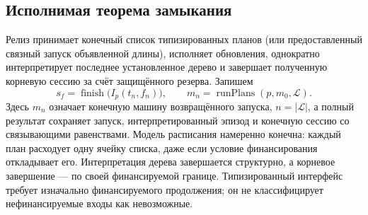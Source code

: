 \documentclass[10pt,a4paper]{article}
\newcommand{\finish}{\operatorname{finish}}
\begin{document}
\subsection{Исполнимая теорема замыкания}
Релиз принимает конечный список типизированных планов (или предоставленный связный запуск объявленной длины), исполняет обновления, однократно интерпретирует последнее установленное дерево и завершает полученную корневую сессию за счёт защищённого резерва. Запишем
\begin{equation}\label{eq:release-pipeline}
 s_f=\finish\bigl(I_p(t_n,f_n)\bigr),\qquad
 m_n=\operatorname{runPlans}(p,m_0,\mathcal L).
\end{equation}
Здесь $m_n$ означает конечную машину возвращённого запуска, $n=|\mathcal L|$, а полный результат сохраняет запуск, интерпретированный эпизод и конечную сессию со связывающими равенствами. Модель расписания намеренно конечна: каждый план расходует одну ячейку списка, даже если условие финансирования откладывает его. Интерпретация дерева завершается структурно, а корневое завершение --- по своей финансируемой границе. Типизированный интерфейс требует изначально финансируемого продолжения; он не классифицирует нефинансируемые входы как невозможные.
\end{document}
